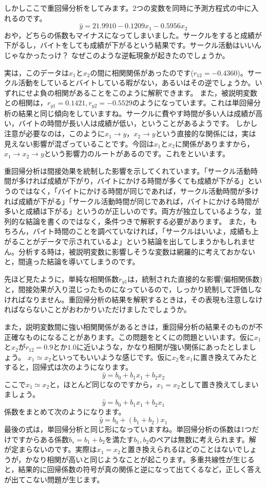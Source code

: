 \documentclass{ltjbook}
\begin{document}
しかしここで重回帰分析をしてみます。2つの変数を同時に予測方程式の中に入れるのです。
\[\hat{y} = 21.9910 -0.1209 x_1 - 0.5956x_2\]
おや，どちらの係数もマイナスになってしまいました。サークルをすると成績が下がるし，バイトをしても成績が下がるという結果です。サークル活動はいいんじゃなかったっけ？ なぜこのような逆転現象が起きたのでしょうか。

実は，このデータは$x_1$と$x_2$の間に相関関係があったのです($r_{12}=-0.4360$)。サークル活動をしているとバイトしている暇がない，あるいはその逆でしょうか。いずれにせよ負の相関があることをこのように解釈できます。
また，被説明変数との相関は，$r_{y1}=0.1421,r_{y2}=-0.5529$のようになっています。これは単回帰分析の結果と同じ傾向をしていますね。サークルに費やす時間が多い人は成績が高い，バイトの時間が長い人は成績が低い，ということがあるようです。
しかし注意が必要なのは，このように$x_1 \to y$，$x_2 \to y$という直接的な関係には，実は見えない影響が混ざっていることです。今回は$x_1$と$x_2$に関係がありますから，$x_1 \to x_2 \to y$という影響力のルートがあるのです。これをといいます。

重回帰分析は間接効果を統制した影響を示してくれています。「サークル活動時間が多ければ成績が下がり，バイトにかける時間が多くても成績が下がる」というのではなく，「バイトにかける時間が同じであれば，サークル活動時間が多ければ成績が下がる」「サークル活動時間が同じであれば，バイトにかける時間が多いと成績は下がる」というのが正しいのです。両方が独立しているような，並列的な結論を書くのではなく，条件つきで解釈する必要があります。
また，もちろん，バイト時間のことを調べていなければ，「サークルはいいよ，成績も上がることがデータで示されているよ」という結論を出してしまうかもしれません。分析する時は，被説明変数に影響しそうな変数は網羅的に考えておかないと，間違った結論を導いてしまうのです。

先ほど見たように，単純な相関係数$r_{y1}$は，統制された直接的な影響(偏相関係数)と，間接効果が入り混じったものになっているので，しっかり統制して評価しなければなりません。重回帰分析の結果を解釈するときは，その表現も注意しなければならないことがおわかりいただけましたでしょうか。

また，説明変数間に強い相関関係があるときは，重回帰分析の結果そのものが不正確なものになることがあります。この問題をとくにの問題といいます。仮に$x_1$と$x_2$が$r_{12}=0.9$とか$1.0$に近いような，かなり相関が強い関係にあったとしましょう。
$x_1 \simeq x_2$といってもいいような感じです。仮に$x_2$を$x_1$に置き換えてみたとすると，回帰式は次のようになります。
\[ \hat{y} = b_0 + b_1 x_1 + b_2x_2 \]
ここで$x_1 \simeq x_2$と，ほとんど同じなのですから，$x_1=x_2$として置き換えてしまいましょう。
\[ \hat{y} = b_0 + b_1 x_1 + b_2x_1 \]
係数をまとめて次のようになります。
\[ \hat{y} = b_0 + (b_1+b_2) x_1 \]
最後の式は，単回帰分析と同じ形になっていますね。単回帰分析の係数は1つだけですからある係数$b_s = b_1 + b_2$を満たす$b_1,b_2$のペアは無数に考えられます。解が定まらないのです。実際は$x_1=x_2$と置き換えられるほどのことはないでしょうが，かなり相関が高いと同じようなことが起こります。多重共線性が生じると，結果的に回帰係数の符号が真の関係と逆になって出てくるなど，正しく答えが出てこない問題が生じます。
\end{document}
